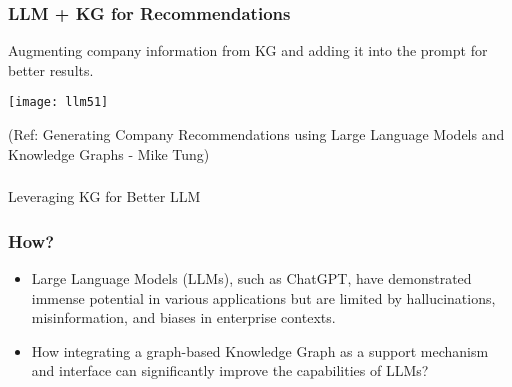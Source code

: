 \begin{frame}[fragile]\frametitle{LLM + KG for Recommendations}

Augmenting company information from KG and adding it into the prompt for better results.

\begin{center}
\texttt{[image: llm51]}
\end{center}	

{\tiny (Ref: Generating Company Recommendations using Large Language Models and Knowledge Graphs - Mike Tung)}

\end{frame}

\begin{frame}[fragile]\frametitle{}
\begin{center}
{\Large Leveraging KG for Better LLM}
\end{center}
\end{frame}

\begin{frame}[fragile]\frametitle{How?}

\begin{itemize}
\item Large Language Models (LLMs), such as ChatGPT, have demonstrated immense potential in various applications but are limited by hallucinations, misinformation, and biases in enterprise contexts.
\item How integrating a graph-based Knowledge Graph as a support mechanism and interface can significantly improve the capabilities of LLMs?
\end{itemize}	

\end{frame}

